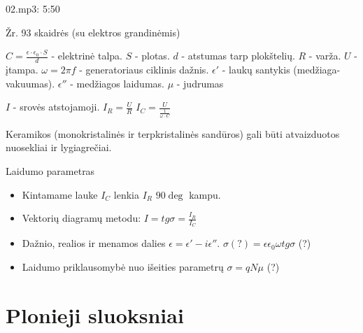 02.mp3: 5:50


Žr. 93 skaidrės (su elektros grandinėmis)

$C = \frac{\epsilon \cdot \epsilon_0 \cdot S}{d}$ - elektrinė talpa.
$S$ - plotas.
$d$ - atstumas tarp plokštelių.
$R$ - varža.
$U$ - įtampa.
$\omega = 2 \pi f$ - generatoriaus ciklinis dažnis.
$\epsilon'$ - laukų santykis (medžiaga-vakuumas).
$\epsilon''$ - medžiagos laidumas.
$\mu$ - judrumas

$I$ - srovės atstojamoji.
$I_R = \frac{U}{R}$
$I_C = \frac{U}{\frac{1}{\omega \cdot C}}$

\begin{remember}
  \item Keramikos (monokristalinės ir terpkristalinės sandūros) gali
  būti atvaizduotos nuosekliai ir lygiagrečiai.
  \item Laidumo parametras\begin{itemize}
    \item Kintamame lauke $I_C$ lenkia $I_R$ $90\deg$ kampu.
    \item Vektorių diagramų metodu: $I = tg \sigma = \frac{I_R}{I_C}$
    \item Dažnio, realios ir menamos dalies
    $\epsilon = \epsilon' - i\epsilon''$.
    $\sigma (?) = \epsilon \epsilon_0 \omega tg \sigma$ (?)
    \item Laidumo priklausomybė nuo išeities parametrų
    $\sigma = qN\mu$ (?)
  \end{itemize}
\end{remember}

\section{Plonieji sluoksniai}


